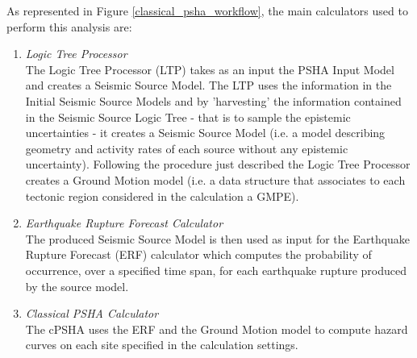 As represented in Figure \ref{classical_psha_workflow}, the main calculators 
used to perform this analysis are:
\begin{enumerate}
%
\item \emph{Logic Tree Processor} \hfill \\
The Logic Tree Processor (LTP) takes as an input the PSHA Input Model and 
creates a Seismic Source Model. The LTP uses the information in the Initial 
Seismic Source Models and by 'harvesting' the information contained in the 
Seismic Source Logic Tree - that is to sample the epistemic uncertainties - 
it creates a Seismic Source Model (i.e. a model describing geometry and 
activity rates of each source without any epistemic uncertainty). 
%
Following the procedure just described the Logic Tree Processor creates a 
Ground Motion model (i.e. a data structure that associates to each tectonic 
region considered in the calculation a GMPE).
%
\item \emph{Earthquake Rupture Forecast Calculator} \hfill \\
The produced Seismic Source Model is then used as input for the Earthquake 
Rupture Forecast (ERF) calculator which computes the probability of occurrence, 
over a specified time span, for each earthquake rupture produced by the source 
model.
\item \emph{Classical PSHA Calculator} \hfill \\
The cPSHA uses the ERF and the Ground Motion model to compute hazard curves on 
each site specified in the calculation settings.
\end{enumerate} 
%
